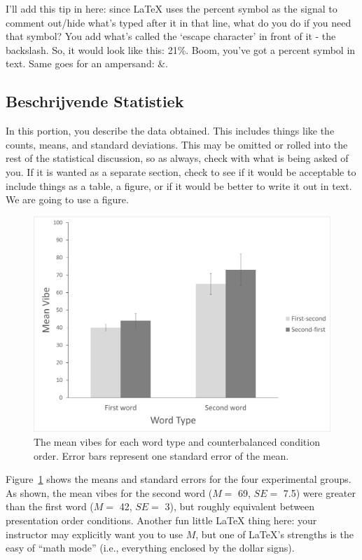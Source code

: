 \documentclass[stu,12pt,floatsintext]{apa7}
\begin{document}
I'll add this tip in here: since \LaTeX{} uses the percent symbol as the signal to comment out/hide what's typed after it in that line, what do you do if you need that symbol? You add what's called the `escape character' in front of it - the backslash. So, it would look like this: 21\%. Boom, you've got a percent symbol in text. Same goes for an ampersand: \&.

\subsection{Beschrijvende Statistiek}

In this portion, you describe the data obtained. This includes things like the counts, means, and standard deviations. This may be omitted or rolled into the rest of the statistical discussion, so as always, check with what is being asked of you. If it is wanted as a separate section, check to see if it would be acceptable to include things as a table, a figure, or if it would be better to write it out in text. We are going to use a figure.

\begin{figure}
    \centering
    \includegraphics[width=0.75\linewidth]{sampleFig.png} %
    \caption{The mean vibes for each word type and counterbalanced condition order. Error bars represent one standard error of the mean.}
    \label{fig:OverallEffect}
\end{figure}

Figure~\ref{fig:OverallEffect} shows the means and standard errors for the four experimental groups. As shown, the mean vibes for the second word ($M = $ 69, $SE = $ 7.5) were greater than the first word ($M = $ 42, $SE = $ 3), but roughly equivalent between presentation order conditions. Another fun little \LaTeX{} thing here: your instructor may explicitly want you to use $M$, but one of \LaTeX{}'s strengths is the easy of ``math mode'' (i.e., everything enclosed by the dollar signs). %
\end{document}

